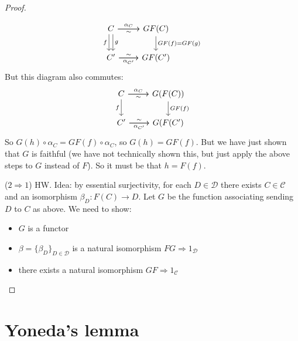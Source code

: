 \documentclass[12pt]{article}
\begin{document}
\begin{proof}
\begin{itemize}
\begin{equation*}
\begin{tikzcd}
C \arrow[d, "f"', shift right] \arrow[d, "g", shift left] \arrow[r, "\alpha_C"] \arrow[r, "\sim"'] & GF(C) \arrow[d, "GF(f)=GF(g)"] \\
C' \arrow[r, "\alpha_{C'}"'] \arrow[r, "\sim"]                                                     & GF(C')                        
\end{tikzcd}
			\end{equation*}
			But this diagram also commutes:
			\begin{equation*}
\begin{tikzcd}
C \arrow[d, "f"'] \arrow[r, "\alpha_C"] \arrow[r, "\sim"'] & G(F(C)) \arrow[d, "GF(f)"] \\
C' \arrow[r, "\alpha_{C'}"'] \arrow[r, "\sim"]             & G(F(C')                   
\end{tikzcd}
			\end{equation*}
			So $G(h)\circ\alpha_C = GF(f)\circ\alpha_C$, so $G(h)=GF(f)$. But we have just shown that $G$ is faithful (we have not technically shown this, but just apply the above steps to $G$ instead of $F$). So it must be that $h=F(f)$.
	\end{itemize}

	($2\Rightarrow 1$) HW. Idea: by essential surjectivity, for each $D\in\mathcal{D}$ there exists $C\in\mathcal{C}$ and an isomorphism $\beta_D: F(C)\to D$. Let $G$ be the function associating sending $D$ to $C$ as above. We need to show:
	\begin{itemize}
		\item $G$ is a functor 
		\item $\beta=\{\beta_D\}_{D\in\mathcal{D}}$ is a natural isomorphism $FG\Rightarrow 1_\mathcal{D}$
		\item there exists a natural isomorphism $GF\Rightarrow 1_\mathcal{C}$
	\end{itemize}
\end{proof}
	

\section{Yoneda's lemma} %
\end{document}
